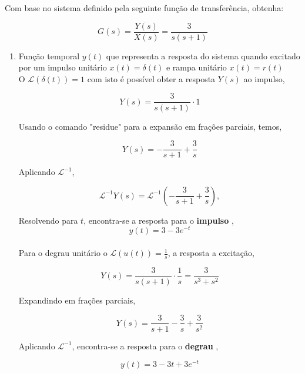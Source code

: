\documentclass[a4paper, 10pt]{article}
\begin{document}
\begin{list}{\textbf{Questão .}}{
\setlength{\labelwidth}{-2mm} \setlength{\parsep}{0mm}
\setlength{\topsep}{0mm} \setlength{\leftmargin}{0mm}}
\item 
    Com base no sistema definido pela seguinte função de transferência, obtenha:

    $$
    G(s) = \frac{Y(s)}{X(s)} = \frac{3}{s(s+1)}
    $$
    \begin{enumerate}
        \item
            Função temporal $y(t)$ que representa a resposta do sistema quando excitado
            por um impulso unitário $x(t)=\delta(t)$ e rampa unitário $x(t)=r(t)$ \\

            O $\mathcal{L}(\delta(t)) = 1$ com isto é possível obter a resposta 
            $Y(s)$ ao impulso, 
    
            $$
                Y(s) = \frac{3}{s(s+1)} \cdot 1
            $$

            Usando o comando "residue" para a expansão em frações parciais, temos,

            $$
                Y(s) = -\frac{3}{s+1} + \frac{3}{s}
            $$

            Aplicando $\mathcal{L}^{-1}$,

            $$
            \mathcal{L}^{-1}Y(s)=\mathcal{L}^{-1}( -\frac{3}{s+1} + \frac{3}{s} ),
            $$

            Resolvendo para $t$, encontra-se a resposta para o \textbf{impulso} ,
            \begin{equation}
                y(t) = 3 - 3 e^{-t}
            \end{equation}\\

            

            Para o degrau unitário o $\mathcal{L}(u(t)) = \frac{1}{s}$, a resposta a excitação,

            $$
            Y(s) = \frac{3}{s(s+1)} \cdot \frac{1}{s} = \frac{3}{s^3+s^2}
            $$

            Expandindo em frações parciais,

            $$
            Y(s) = \frac{3}{s+1} - \frac{3}{s} + \frac{3}{s^2} 
            $$

            Aplicando $\mathcal{L}^{-1}$, encontra-se a resposta para o \textbf{degrau} ,

            \begin{equation}
            y(t) = 3 - 3 t + 3 e^{-t}
            \end{equation}\\



\end{enumerate}
\end{list}
\end{document}
